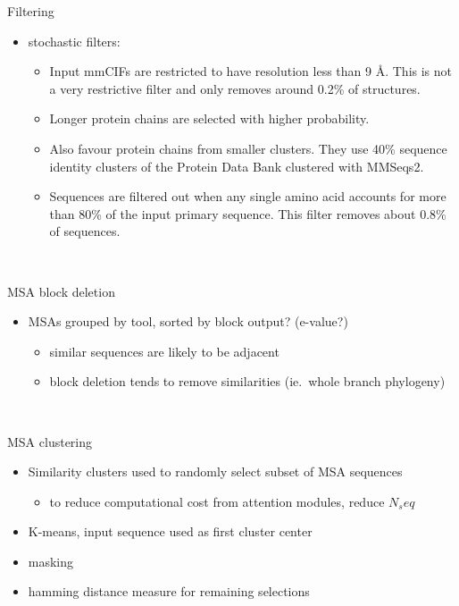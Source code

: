 \documentclass[presentation, smaller]{beamer}
\begin{document}
\begin{frame}[label={sec:orga942f37}]{Filtering}
\begin{itemize}
\item stochastic filters:
\begin{itemize}
\item Input mmCIFs are restricted to have resolution less than 9 Å. This is not a very restrictive filter and only removes around 0.2\% of structures.
\item Longer protein chains are selected with higher probability.
\item Also favour protein chains from smaller clusters. They use 40\% sequence identity clusters of the Protein Data Bank clustered with MMSeqs2.
\item Sequences are filtered out when any single amino acid accounts for more than 80\% of the input primary sequence. This filter removes about 0.8\% of sequences.
\end{itemize}
\end{itemize}~\cite{jumperHighlyAccurateProtein2021}
\end{frame}
\begin{frame}[label={sec:org9280f46}]{MSA block deletion}
\begin{itemize}
\item MSAs grouped by tool, sorted by block output? (e-value?)
\begin{itemize}
\item similar sequences are likely to be adjacent
\item block deletion tends to remove similarities (ie.\ whole branch phylogeny)
\end{itemize}
\end{itemize}~\cite{jumperHighlyAccurateProtein2021}
\end{frame}
\begin{frame}[label={sec:orgc99ffd7}]{MSA clustering}
\begin{itemize}
\item Similarity clusters used to randomly select subset of MSA sequences
\begin{itemize}
\item to reduce computational cost from attention modules, reduce \(N_seq\)
\end{itemize}

\item K-means, input sequence used as first cluster center
\item masking
\item hamming distance measure for remaining selections
\end{itemize}~\cite{jumperHighlyAccurateProtein2021}
\end{frame}
\end{document}
